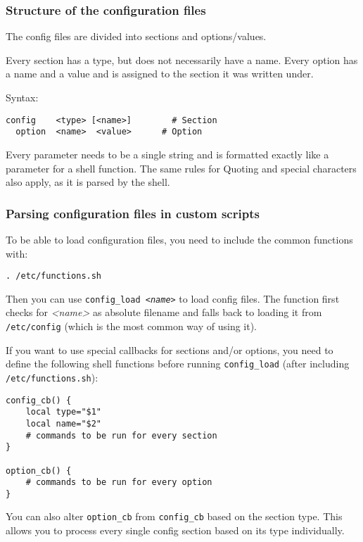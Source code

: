 \subsubsection{Structure of the configuration files}

The config files are divided into sections and options/values.

Every section has a type, but does not necessarily have a name.
Every option has a name and a value and is assigned to the section
it was written under.

Syntax:

\begin{Verbatim}
config    <type> [<name>]	     # Section
  option  <name>  <value>      # Option
\end{Verbatim}

Every parameter needs to be a single string and is formatted exactly
like a parameter for a shell function. The same rules for Quoting and 
special characters also apply, as it is parsed by the shell.

\subsubsection{Parsing configuration files in custom scripts}

To be able to load configuration files, you need to include the common 
functions with:

\begin{Verbatim}
. /etc/functions.sh
\end{Verbatim}

Then you can use \texttt{config\_load \textit{<name>}} to load config files. The function 
first checks for \textit{<name>} as absolute filename and falls back to loading 
it from \texttt{/etc/config} (which is the most common way of using it).

If you want to use special callbacks for sections and/or options, you
need to define the following shell functions before running \texttt{config\_load}
(after including \texttt{/etc/functions.sh}):

\begin{Verbatim}
config_cb() {
	local type="$1"
	local name="$2"
	# commands to be run for every section
}

option_cb() {
	# commands to be run for every option
}
\end{Verbatim}

You can also alter \texttt{option\_cb} from \texttt{config\_cb} based on the section type.
This allows you to process every single config section based on its type
individually.

